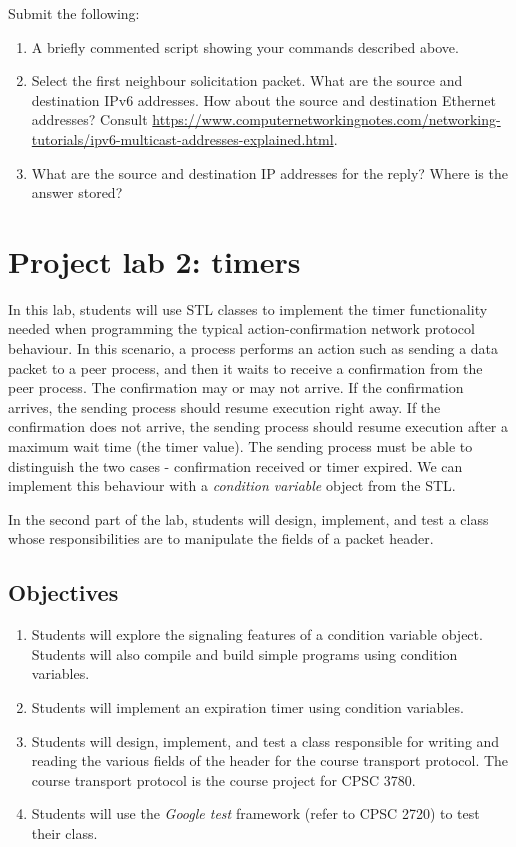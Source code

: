 \documentclass[12pt]{book}
\begin{document}
\begin{enumerate}
      \smallskip
      Submit the following:
  \begin{enumerate}[label=(\alph*)]
  \item A briefly commented script showing your commands described above.
  \item Select the first neighbour solicitation packet. What are the source and destination IPv6 addresses. How about the source and destination Ethernet addresses?
    Consult \url{https://www.computernetworkingnotes.com/networking-tutorials/ipv6-multicast-addresses-explained.html}.
    \item What are the source and destination IP addresses for the reply? Where is the answer stored?
  \end{enumerate}
\end{enumerate}


\chapter{Project lab 2: timers}

In this lab, students will use STL classes to implement the timer functionality needed when programming the typical action-confirmation network protocol behaviour. In this scenario, a process performs an action such as sending a data packet to a peer process, and then it waits to receive a confirmation from the peer process. The confirmation may or may not arrive. If the confirmation arrives, the sending process should resume execution right away. If the confirmation does not arrive, the sending process should resume execution after a maximum wait time (the timer value). The sending process must be able to distinguish the two cases - confirmation received or timer expired. We can implement this behaviour with a \emph{condition variable} object from the STL.

In the second part of the lab, students will design, implement, and test a class whose responsibilities are to manipulate the fields of a packet header.

\section{Objectives}

\begin{enumerate}[label=Objective \arabic*:]
\item\label{unu.l2} Students will explore the signaling features of a condition variable object. Students will also compile and build simple programs using condition variables. 
\item\label{doi.l2} Students will implement an expiration timer using condition variables.
\item\label{trei.l2} Students will design, implement, and test a class responsible for writing and reading the various fields of the header for the course transport protocol. The course transport protocol is the course project for CPSC 3780.
\item\label{patru.l2} Students will use the \emph{Google test} framework (refer to CPSC 2720) to test their class.

\end{enumerate}
\end{document}
